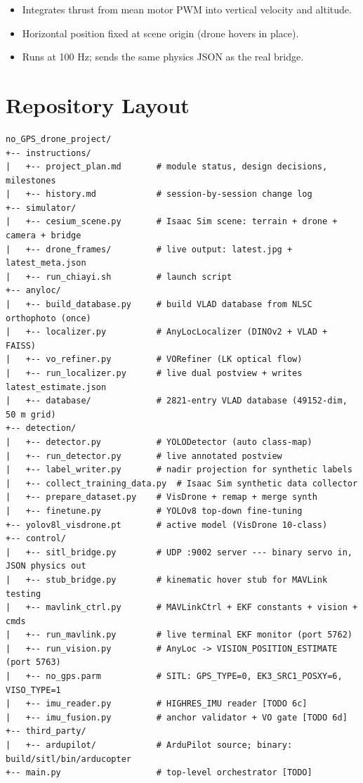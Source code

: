 \documentclass[11pt,a4paper]{article}
\begin{document}
\begin{itemize}
  \item Integrates thrust from mean motor PWM into vertical velocity and altitude.
  \item Horizontal position fixed at scene origin (drone hovers in place).
  \item Runs at 100 Hz; sends the same physics JSON as the real bridge.
\end{itemize}

\section{Repository Layout}
\label{sec:layout}

\begin{lstlisting}[caption={Project directory tree},label={lst:tree}]
no_GPS_drone_project/
+-- instructions/
|   +-- project_plan.md       # module status, design decisions, milestones
|   +-- history.md            # session-by-session change log
+-- simulator/
|   +-- cesium_scene.py       # Isaac Sim scene: terrain + drone + camera + bridge
|   +-- drone_frames/         # live output: latest.jpg + latest_meta.json
|   +-- run_chiayi.sh         # launch script
+-- anyloc/
|   +-- build_database.py     # build VLAD database from NLSC orthophoto (once)
|   +-- localizer.py          # AnyLocLocalizer (DINOv2 + VLAD + FAISS)
|   +-- vo_refiner.py         # VORefiner (LK optical flow)
|   +-- run_localizer.py      # live dual postview + writes latest_estimate.json
|   +-- database/             # 2821-entry VLAD database (49152-dim, 50 m grid)
+-- detection/
|   +-- detector.py           # YOLODetector (auto class-map)
|   +-- run_detector.py       # live annotated postview
|   +-- label_writer.py       # nadir projection for synthetic labels
|   +-- collect_training_data.py  # Isaac Sim synthetic data collector
|   +-- prepare_dataset.py    # VisDrone + remap + merge synth
|   +-- finetune.py           # YOLOv8 top-down fine-tuning
+-- yolov8l_visdrone.pt       # active model (VisDrone 10-class)
+-- control/
|   +-- sitl_bridge.py        # UDP :9002 server --- binary servo in, JSON physics out
|   +-- stub_bridge.py        # kinematic hover stub for MAVLink testing
|   +-- mavlink_ctrl.py       # MAVLinkCtrl + EKF constants + vision + cmds
|   +-- run_mavlink.py        # live terminal EKF monitor (port 5762)
|   +-- run_vision.py         # AnyLoc -> VISION_POSITION_ESTIMATE (port 5763)
|   +-- no_gps.parm           # SITL: GPS_TYPE=0, EK3_SRC1_POSXY=6, VISO_TYPE=1
|   +-- imu_reader.py         # HIGHRES_IMU reader [TODO 6c]
|   +-- imu_fusion.py         # anchor validator + VO gate [TODO 6d]
+-- third_party/
|   +-- ardupilot/            # ArduPilot source; binary: build/sitl/bin/arducopter
+-- main.py                   # top-level orchestrator [TODO]
\end{lstlisting}
\end{document}
